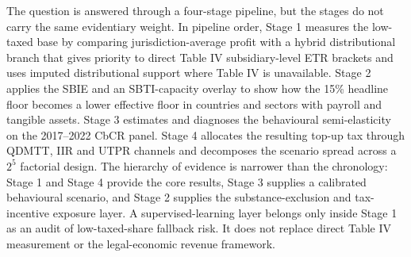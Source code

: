 \documentclass[11pt,a4paper]{article}
\begin{document}
The question is answered through a four-stage pipeline, but the stages do not carry the same evidentiary weight. In pipeline order, Stage 1 measures the low-taxed base by comparing jurisdiction-average profit with a hybrid distributional branch that gives priority to direct Table IV subsidiary-level ETR brackets and uses imputed distributional support where Table IV is unavailable. Stage 2 applies the SBIE and an SBTI-capacity overlay to show how the 15\% headline floor becomes a lower effective floor in countries and sectors with payroll and tangible assets. Stage 3 estimates and diagnoses the behavioural semi-elasticity on the 2017--2022 CbCR panel. Stage 4 allocates the resulting top-up tax through QDMTT, IIR and UTPR channels and decomposes the scenario spread across a $2^5$ factorial design. The hierarchy of evidence is narrower than the chronology: Stage 1 and Stage 4 provide the core results, Stage 3 supplies a calibrated behavioural scenario, and Stage 2 supplies the substance-exclusion and tax-incentive exposure layer. A supervised-learning layer belongs only inside Stage 1 as an audit of low-taxed-share fallback risk. It does not replace direct Table IV measurement or the legal-economic revenue framework.
\end{document}
